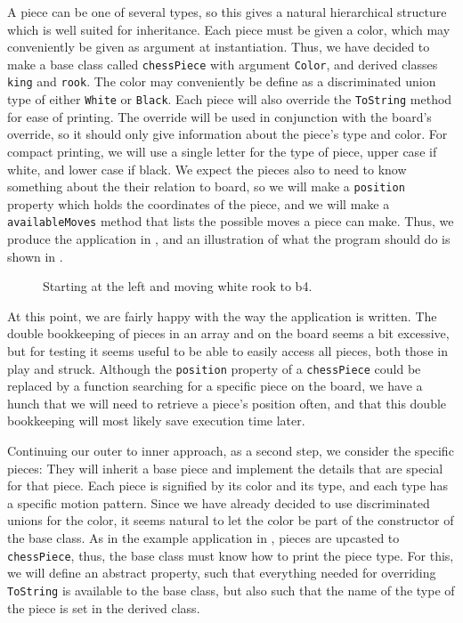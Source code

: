 \documentclass[fsharpNotes.tex]{subfiles}
\begin{document}
A piece can be one of several types, so this gives a natural hierarchical structure which is well suited for inheritance. Each piece must be given a color, which may conveniently be given as argument at instantiation. Thus, we have decided to make a base class called \lstinline{chessPiece} with argument \lstinline{Color}, and derived classes \lstinline{king} and \lstinline{rook}. The color may conveniently be define as a discriminated union type of either \lstinline{White} or \lstinline{Black}. Each piece will also override the \lstinline{ToString} method for ease of printing. The override will be used in conjunction with the board's override, so it should only give information about the piece's type and color. For compact printing, we will use a single letter for the type of piece, upper case if white, and lower case if black. We expect the pieces also to need to know something about the their relation to board, so we will make a \lstinline{position} property which holds the coordinates of the piece, and we will make a \lstinline{availableMoves} method that lists the possible moves a piece can make. Thus, we produce the application in , and an illustration of what the program should do is shown in .
%
%
\begin{figure}
  \centering
  \newgame
  \showboard
  \hspace*{1cm}
  \showboard
  \caption{Starting at the left and moving white rook to b4.}
  \label{fig:chessKingsGame}
\end{figure}
At this point, we are fairly happy with the way the application is written. The double bookkeeping of pieces in an array and on the board seems a bit excessive, but for testing it seems useful to be able to easily access all pieces, both those in play and struck. Although the \lstinline{position} property of a \lstinline{chessPiece} could be replaced by a function searching for a specific piece on the board, we have a hunch that we will need to retrieve a piece's position often, and that this double bookkeeping will most likely save execution time later. 

Continuing our outer to inner approach, as a second step, we consider the specific pieces: They will inherit a base piece and implement the details that are special for that piece. Each piece is signified by its color and its type, and each type has a specific motion pattern. Since we have already decided to use discriminated unions for the color, it seems natural to let the color be part of the constructor of the base class. As in the example application in , pieces are upcasted to \lstinline{chessPiece}, thus, the base class must know how to print the piece type. For this, we will define an abstract property, such that everything needed for overriding \lstinline{ToString} is available to the base class, but also such that the name of the type of the piece is set in the derived class.
\end{document}
